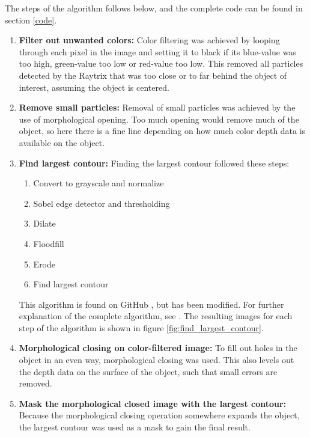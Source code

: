 The steps of the algorithm follows below, and the complete code can be found in section \ref{code}.
\newpage

\begin{enumerate}
    \item \textbf{Filter out unwanted colors:}
    Color filtering was achieved by looping through each pixel in the image and setting it to black if its blue-value was too high, green-value too low or red-value too low. This removed all particles detected by the Raytrix that was too close or to far behind the object of interest, assuming the object is centered.
    
    \item \textbf{Remove small particles:}
    Removal of small particles was achieved by the use of morphological opening. Too much opening would remove much of the object, so here there is a fine line depending on how much color depth data is available on the object.
    
    \item \textbf{Find largest contour:} 
    Finding the largest contour followed these steps: 
    \begin{enumerate}[label*=\arabic*.]
        \item Convert to grayscale and normalize
        \item Sobel edge detector and thresholding
        \item Dilate
        \item Floodfill
        \item Erode
        \item Find largest contour
    \end{enumerate}
    This algorithm is found on GitHub \cite{website:largest_contour_code_github}, but has been modified. For further explanation of the complete algorithm, see \cite{website:largest_contour_code_explanation}.
    The resulting images for each step of the algorithm is shown in figure \ref{fig:find_largest_contour}.
    
    \item \textbf{Morphological closing on color-filtered image:}
    To fill out holes in the object in an even way, morphological closing was used. This also levels out the depth data on the surface of the object, such that small errors are removed.
    
    \item \textbf{Mask the morphological closed image with the largest contour:}
    Because the morphological closing operation somewhere expands the object, the largest contour was used as a mask to gain the final result. 
\end{enumerate}

